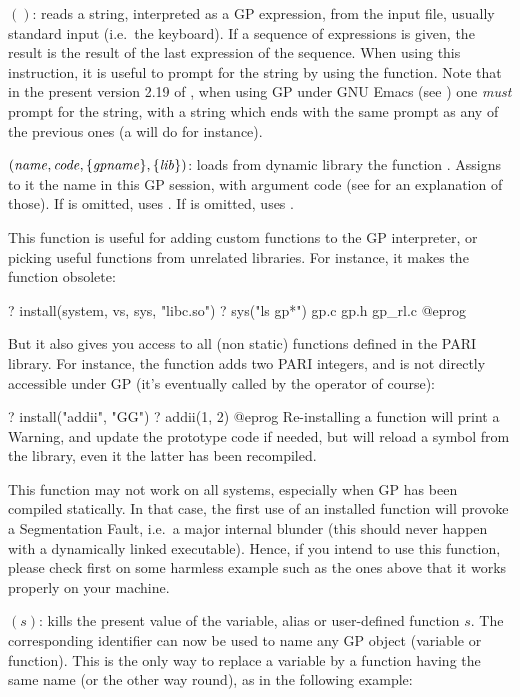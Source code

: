 $()$: reads a string, interpreted as a GP expression,
from the input file, usually standard input (i.e.~the keyboard). If a
sequence of expressions is given, the result is the result of the last
expression of the sequence. When using this instruction, it is useful to
prompt for the string by using the  function. Note that in the
present version 2.19 of , when using GP under GNU Emacs (see
) one \emph{must} prompt for the string, with a string
which ends with the same prompt as any of the previous ones (a 
will do for instance).

$(\hbox{\it name\/},\hbox{\it code\/},\{\hbox{\it gpname\/}\},\{\hbox{\it lib\/}\})$:
loads from dynamic library  the function . Assigns to it
the name  in this GP session, with argument code  (see
 for an explanation of those). If  is
omitted, uses . If  is omitted, uses
.\label{se:install}

This function is useful for adding custom functions to the GP interpreter,
or picking useful functions from unrelated libraries. For instance, it
makes the function  obsolete:

\bprog
? install(system, vs, sys, "libc.so")
? sys("ls gp*")
gp.c            gp.h            gp_rl.c
@eprog

But it also gives you access to all (non static) functions defined in the
PARI library. For instance, the function  adds
two PARI integers, and is not directly accessible under GP (it's eventually
called by the \kbd{+} operator of course):

\bprog
? install("addii", "GG")
? addii(1, 2)
@eprog
Re-installing a function will print a Warning, and update the prototype code
if needed, but will reload a symbol from the library, even it the latter has
been recompiled.

 This function may not work on all systems, especially
when GP has been compiled statically. In that case, the first use of an
installed function will provoke a Segmentation Fault, i.e.~a major internal
blunder (this should never happen with a dynamically linked executable).
Hence, if you intend to use this function, please check first on some
harmless example such as the ones above that it works properly on your
machine.

$(s)$:\label{se:kill} kills the present value of the
variable, alias or user-defined function $s$. The corresponding identifier
can now be used to name any GP object (variable or function). This is the
only way to replace a variable by a function having the same name (or the
other way round), as in the following example:

